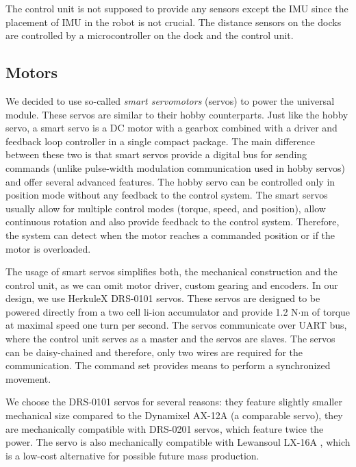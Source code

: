 The control unit is not supposed to provide any sensors except the IMU since the
placement of IMU in the robot is not crucial. The distance sensors on the docks
are controlled by a microcontroller on the dock and the control unit.


\subsection{Motors}

We decided to use so-called \emph{smart servomotors} (servos) to power the
universal module. These servos are similar to their hobby counterparts. Just
like the hobby servo, a smart servo is a DC motor with a gearbox combined with a
driver and feedback loop controller in a single compact package. The main
difference between these two is that smart servos provide a digital bus for
sending commands (unlike pulse-width modulation communication used in hobby
servos) and offer several advanced features. The hobby servo can be controlled
only in position mode without any feedback to the control system. The smart
servos usually allow for multiple control modes (torque, speed, and position),
allow continuous rotation and also provide feedback to the control system.
Therefore, the system can detect when the motor reaches a commanded
position or if the motor is overloaded.

The usage of smart servos simplifies both, the mechanical construction and the
control unit, as we can omit motor driver, custom gearing and encoders. In our
design, we use HerkuleX DRS-0101 \cite{noauthor_herkulex_nodate} servos. These
servos are designed to be powered directly from a two cell li-ion accumulator
and provide 1.2 N$\cdot$m of torque at maximal speed one turn per second. The
servos communicate over UART bus, where the control unit serves as a master and
the servos are slaves. The servos can be daisy-chained and therefore, only two
wires are required for the communication. The command set provides means to
perform a synchronized movement.

We choose the DRS-0101 servos for several reasons: they feature slightly smaller
mechanical size compared to the Dynamixel AX-12A \cite{noauthor_dynamixel_2006}
(a comparable servo), they are mechanically compatible with DRS-0201
\cite{noauthor_herkulex_nodate} servos, which feature twice the power. The servo
is also mechanically compatible with Lewansoul LX-16A
\cite{noauthor_lx-16a_2018}, which is a low-cost alternative for possible future
mass production.

